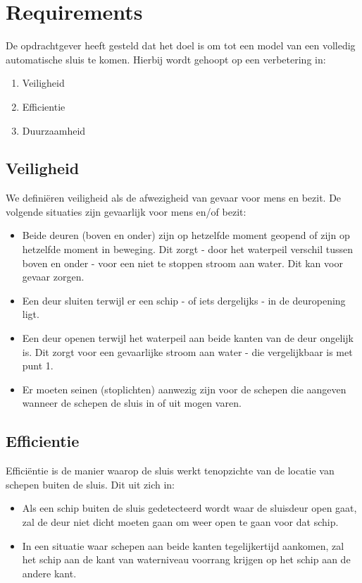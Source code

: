 \documentclass{article} %
\begin{document}
\section{Requirements}
De opdrachtgever heeft gesteld dat het doel is om tot een model van een volledig automatische sluis te komen. Hierbij wordt gehoopt op een verbetering in:
\begin{enumerate}
    \item Veiligheid
    \item Efficientie
    \item Duurzaamheid
\end{enumerate}

\subsection{Veiligheid}
We definiëren veiligheid als de afwezigheid van gevaar voor mens en bezit. De volgende situaties zijn gevaarlijk voor mens en/of bezit:
\begin{itemize}
    \item Beide deuren (boven en onder) zijn op hetzelfde moment geopend of zijn op hetzelfde moment in beweging. Dit zorgt - door het waterpeil verschil tussen boven en onder - voor een niet te stoppen stroom aan water. Dit kan voor gevaar zorgen.
    \item Een deur sluiten terwijl er een schip - of iets dergelijks - in de deuropening ligt.
    \item Een deur openen terwijl het waterpeil aan beide kanten van de deur ongelijk is. Dit zorgt voor een gevaarlijke stroom aan water - die vergelijkbaar is met punt 1.
    \item Er moeten seinen (stoplichten) aanwezig zijn voor de schepen die aangeven wanneer de schepen de sluis in of uit mogen varen.
\end{itemize}

\subsection{Efficientie}
Efficiëntie is de manier waarop de sluis werkt tenopzichte van de locatie van schepen buiten de sluis. Dit uit zich in:
\begin{itemize}
    \item Als een schip buiten de sluis gedetecteerd wordt waar de sluisdeur open gaat, zal de deur niet dicht moeten gaan om weer open te gaan voor dat schip.
    \item In een situatie waar schepen aan beide kanten tegelijkertijd aankomen, zal het schip aan de kant van waterniveau voorrang krijgen op het schip aan de andere kant.
\end{itemize}
\end{document}
